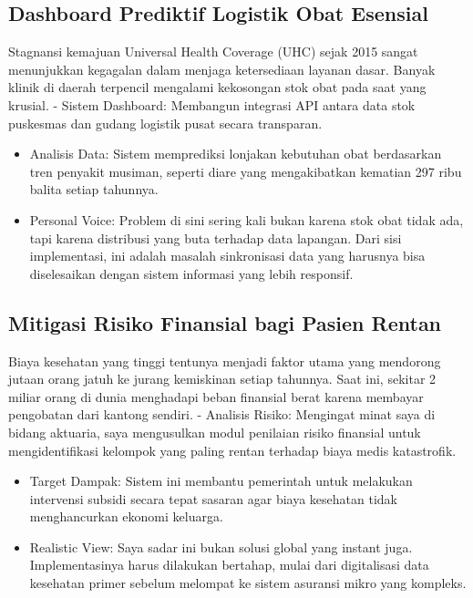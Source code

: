 \documentclass[
  letterpaper,
  DIV=11,
  numbers=noendperiod]{scrreprt}
\begin{document}
\subsection{Dashboard Prediktif Logistik Obat
Esensial}\label{dashboard-prediktif-logistik-obat-esensial}

Stagnansi kemajuan Universal Health Coverage (UHC) sejak 2015 sangat
menunjukkan kegagalan dalam menjaga ketersediaan layanan dasar. Banyak
klinik di daerah terpencil mengalami kekosongan stok obat pada saat yang
krusial. - Sistem Dashboard: Membangun integrasi API antara data stok
puskesmas dan gudang logistik pusat secara transparan.

\begin{itemize}
\item
  Analisis Data: Sistem memprediksi lonjakan kebutuhan obat berdasarkan
  tren penyakit musiman, seperti diare yang mengakibatkan kematian 297
  ribu balita setiap tahunnya.
\item
  Personal Voice: Problem di sini sering kali bukan karena stok obat
  tidak ada, tapi karena distribusi yang buta terhadap data lapangan.
  Dari sisi implementasi, ini adalah masalah sinkronisasi data yang
  harusnya bisa diselesaikan dengan sistem informasi yang lebih
  responsif.
\end{itemize}

\subsection{Mitigasi Risiko Finansial bagi Pasien
Rentan}\label{mitigasi-risiko-finansial-bagi-pasien-rentan}

Biaya kesehatan yang tinggi tentunya menjadi faktor utama yang mendorong
jutaan orang jatuh ke jurang kemiskinan setiap tahunnya. Saat ini,
sekitar 2 miliar orang di dunia menghadapi beban finansial berat karena
membayar pengobatan dari kantong sendiri. - Analisis Risiko: Mengingat
minat saya di bidang aktuaria, saya mengusulkan modul penilaian risiko
finansial untuk mengidentifikasi kelompok yang paling rentan terhadap
biaya medis katastrofik.

\begin{itemize}
\item
  Target Dampak: Sistem ini membantu pemerintah untuk melakukan
  intervensi subsidi secara tepat sasaran agar biaya kesehatan tidak
  menghancurkan ekonomi keluarga.
\item
  Realistic View: Saya sadar ini bukan solusi global yang instant juga.
  Implementasinya harus dilakukan bertahap, mulai dari digitalisasi data
  kesehatan primer sebelum melompat ke sistem asuransi mikro yang
  kompleks.
\end{itemize}
\end{document}
